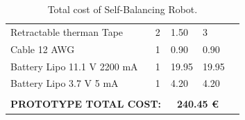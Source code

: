 \begin{table}[H]
{\begin{turn}{90}
\begin{tabular}{|l|l|l|l|l}
		Retractable therman Tape                                    & 2                                         & 1.50                                                                                                                & 3                                                                                                                &  \\ \cline{1-4}
		Cable 12 AWG                                           & 1                                         & 0.90                                                                                                                & 0.90                                                                                                             &  \\ \cline{1-4}
		Battery Lipo 11.1 V 2200 mA                                     & 1                                         & 19.95                                                                                                               & 19.95                                                                                                            &  \\ \cline{1-4}
		Battery Lipo 3.7 V 5 mA                                         & 1                                         & 4.20                                                                                                                & 4.20                                                                                                             &  \\ \cline{1-4}
		\multicolumn{2}{|c|}{}                                                                                      & \multicolumn{2}{c|}{\cellcolor[HTML]{FD6864}}                                                                                                                                                                                          &  \\
		\multicolumn{2}{|c|}{\multirow{-2}{*}{\textbf{PROTOTYPE TOTAL COST:}}}                                     & \multicolumn{2}{c|}{\multirow{-2}{*}{\cellcolor[HTML]{FD6864}\textbf{240.45 \euro}}}                                                                                                                                                         &  \\ \cline{1-4}
	\end{tabular}
	\end{turn}}
	\caption{Total cost of Self-Balancing Robot.}
	\label{tabla:coste}
\end{table}

